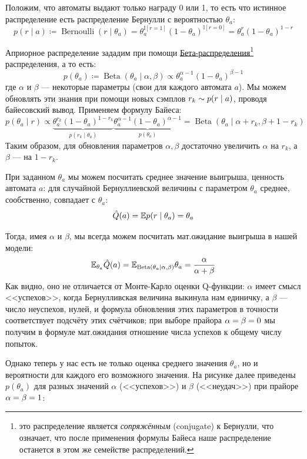 \begin{example}
Положим, что автоматы выдают только награду 0 или 1, то есть что истинное распределение есть распределение Бернулли с вероятностью $\theta_a$:
$$p(r \mid a) \coloneqq \operatorname{Bernoulli}(r \mid \theta_a) = \theta_a^{\mathbb{I}[r = 1]}(1 - \theta_a)^{\mathbb{I}[r = 0]} = \theta_a^{r}(1 - \theta_a)^{1 - r}$$

Априорное распределение зададим при помощи \href{https://en.wikipedia.org/wiki/Beta_distribution}{Бета-распределения}\footnote[1]{это распределение является \emph{сопряжённым} (conjugate) к Бернулли, что означает, что после применения формулы Байеса наше распределение останется в этом же семействе распределений.} распределения, а то есть:
$$p(\theta_a) \coloneqq \operatorname{Beta}(\theta_a \mid \alpha, \beta) \propto \theta_a^{\alpha - 1}(1 - \theta_a)^{\beta - 1}$$
где $\alpha$ и $\beta$ --- некоторые параметры (свои для каждого автомата $a$). Мы можем обновлять эти знания при помощи новых сэмплов $r_k \HM\sim p(r \mid a)$, проводя байесовский вывод. Применяем формулу Байеса:
$$p(\theta_a \mid r) \propto \underbrace{\theta_a^{r_k}(1 - \theta_a)^{1 - r_k}}_{p(r_k \mid \theta_a)}\underbrace{\theta_a^{\alpha - 1}(1 - \theta_a)^{\alpha - 1}}_{p(\theta_a)} = \operatorname{Beta}(\theta_a \mid \alpha + r_k, \beta + 1 - r_k)$$
Таким образом, для обновления параметров $\alpha, \beta$ достаточно увеличить $\alpha$ на $r_k$, а $\beta$ --- на $1 - r_k$.

При заданном $\theta_a$ мы можем посчитать среднее значение выигрыша, ценность автомата $a$: для случайной Бернуллиевской величины с параметром $\theta_a$ среднее, сообственно, совпадает с $\theta_a$: 
$$\hat{Q}(a) = \mathbb{E} p(r \mid \theta_a) = \theta_a$$

Тогда, имея $\alpha$ и $\beta$, мы всегда можем посчитать мат.ожидание выигрыша в нашей модели:
$$\mathbb{E}_{\theta_a} \hat{Q}(a) = \mathbb{E}_{\operatorname{Beta}(\theta_a \mid \alpha, \beta)} \theta_a = \frac{\alpha}{\alpha + \beta}$$
Как видно, оно не отличается от Монте-Карло оценки Q-функции: $\alpha$ имеет смысл <<успехов>>, когда Бернулливская величина выкинула нам единичку, а $\beta$ --- число неуспехов, нулей, и формула обновления этих параметров в точности соответствует подсчёту этих счётчиков; при выборе прайора $\alpha \HM= \beta \HM= 0$ мы получим в формуле мат.ожидания отношение числа успехов к общему числу попыток. 

Однако теперь у нас есть не только оценка среднего значения $\theta_a$, но и вероятности для каждого его возможного значения. На рисунке далее приведены $p(\theta_a)$ для разных значений $\alpha$ (<<успехов>>) и $\beta$ (<<неудач>>) при прайоре $\alpha \HM= \beta \HM= 1$:


\end{example}
